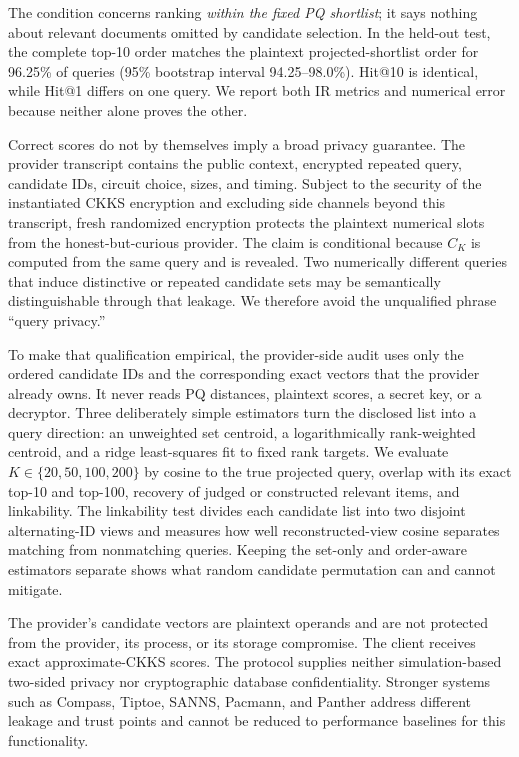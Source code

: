 \documentclass[pdflatex,sn-basic,Numbered]{sn-jnl}
\theoremstyle{plain}
\begin{document}
The condition concerns ranking \emph{within the fixed PQ shortlist}; it says nothing about relevant documents omitted by candidate selection. In the held-out test, the complete top-10 order matches the plaintext projected-shortlist order for 96.25\% of queries (95\% bootstrap interval 94.25--98.0\%). Hit@10 is identical, while Hit@1 differs on one query. We report both IR metrics and numerical error because neither alone proves the other.

Correct scores do not by themselves imply a broad privacy guarantee.
The provider transcript contains the public context, encrypted repeated query, candidate IDs, circuit choice, sizes, and timing. Subject to the security of the instantiated CKKS encryption and excluding side channels beyond this transcript, fresh randomized encryption protects the plaintext numerical slots from the honest-but-curious provider. The claim is conditional because $C_K$ is computed from the same query and is revealed. Two numerically different queries that induce distinctive or repeated candidate sets may be semantically distinguishable through that leakage. We therefore avoid the unqualified phrase ``query privacy.''

To make that qualification empirical, the provider-side audit uses only the ordered candidate IDs and the corresponding exact vectors that the provider already owns. It never reads PQ distances, plaintext scores, a secret key, or a decryptor. Three deliberately simple estimators turn the disclosed list into a query direction: an unweighted set centroid, a logarithmically rank-weighted centroid, and a ridge least-squares fit to fixed rank targets. We evaluate $K\in\{20,50,100,200\}$ by cosine to the true projected query, overlap with its exact top-10 and top-100, recovery of judged or constructed relevant items, and linkability. The linkability test divides each candidate list into two disjoint alternating-ID views and measures how well reconstructed-view cosine separates matching from nonmatching queries. Keeping the set-only and order-aware estimators separate shows what random candidate permutation can and cannot mitigate.

The provider's candidate vectors are plaintext operands and are not protected from the provider, its process, or its storage compromise. The client receives exact approximate-CKKS scores. The protocol supplies neither simulation-based two-sided privacy nor cryptographic database confidentiality. Stronger systems such as Compass, Tiptoe, SANNS, Pacmann, and Panther address different leakage and trust points and cannot be reduced to performance baselines for this functionality.
\end{document}
